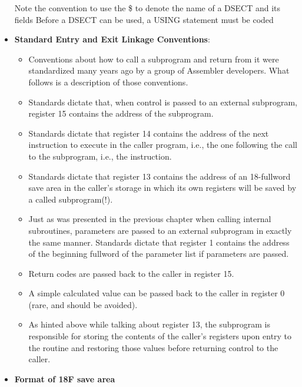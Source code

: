 \documentclass{report}
\begin{document}
\begin{itemize}
            \bigbreak \noindent 
            Note the convention to use the \$ to denote the name of a DSECT and its fields
            \bigbreak \noindent 
            Before a DSECT can be used, a USING statement must be coded
            \bigbreak \noindent 
        \item \textbf{Standard Entry and Exit Linkage Conventions}:
            \begin{itemize}
                \item Conventions about how to call a subprogram and return from it were standardized many years ago by a group of Assembler developers. What follows is a description of those conventions.
                \item Standards dictate that, when control is passed to an external subprogram, register 15 contains the address of the subprogram.
                \item Standards dictate that register 14 contains the address of the next instruction to execute in the caller program, i.e., the one following the call to the subprogram, i.e., the instruction.
                \item Standards dictate that register 13 contains the address of an 18-fullword save area in the caller's storage in which its own registers will be saved by a called subprogram(!).
                \item Just as was presented in the previous chapter when calling internal subroutines, parameters are passed to an external subprogram in exactly the same manner. Standards dictate that register 1 contains the address of the beginning fullword of the parameter list if parameters are passed.
                \item Return codes are passed back to the caller in register 15.
                \item A simple calculated value can be passed back to the caller in register 0 (rare, and should be avoided).
                \item As hinted above while talking about register 13, the subprogram is responsible for storing the contents of the caller's registers upon entry to the routine and restoring those values before returning control to the caller.
            \end{itemize}
        \item \textbf{Format of 18F save area}
            \bigbreak \noindent 

\end{itemize}
\end{document}
